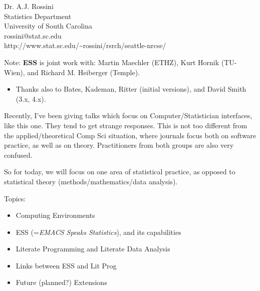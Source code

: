 \documentclass[semhelv]{seminar}
\begin{document}
\begin{slide}

  \begin{center}
    Dr. A.J. Rossini \\
    Statistics Department \\
    University of South Carolina \\
    rossini@stat.sc.edu \\
    {http://www.stat.sc.edu/\~{}rossini/rsrch/seattle-nrcse/} 
  \end{center}
  
  Note: \textbf{ESS} is joint work with: Martin Maechler (ETHZ), Kurt
  Hornik (TU-Wien), and Richard M. Heiberger (Temple).
\end{slide}

\begin{itemize}
\item Thanks also to Bates, Kademan, Ritter (initial versions), and
  David Smith (3.x, 4.x).
\end{itemize}

Recently, I've been giving talks which focus on Computer/Statistician
interfaces, like this one.  They tend to get strange responses.  This
is not too different from the applied/theoretical Comp Sci situation,
where journals focus both on software practice, as well as on theory.
Practitioners from both groups are also very confused.

So for today, we will focus on one area of statistical practice, as
opposed to statistical theory (methods/mathematics/data analysis).

\begin{slide}
  
  Topics:
  \begin{itemize}
  \item Computing Environments
  \item ESS (=\emph{EMACS Speaks Statistics}), and its capabilities
  \item Literate Programming and Literate Data Analysis
  \item Links between ESS and Lit Prog
  \item Future (planned?) Extensions
  \end{itemize}

\end{slide}
\end{document}
